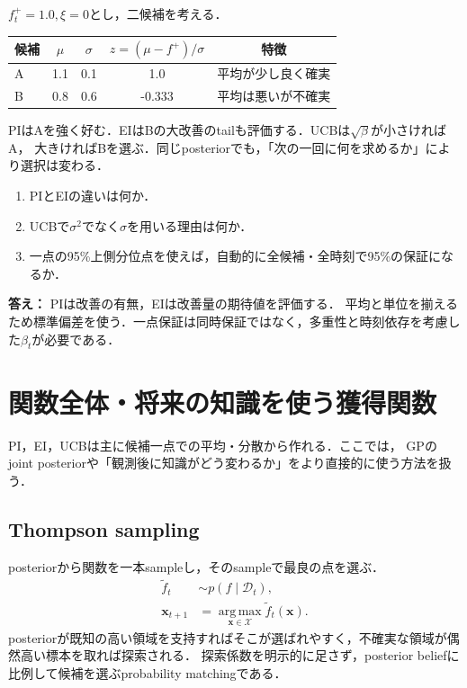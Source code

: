 \documentclass[a4paper,11pt]{ltjsarticle}
\newcommand{\D}{\mathcal D}
\newcommand{\argmax}{\operatorname*{arg\,max}}
\begin{document}
\(f_t^+=1.0,\xi=0\)とし，二候補を考える．
\begin{center}
\begin{tabular}{lcccc}
\toprule
候補&\(\mu\)&\(\sigma\)&\(z=(\mu-f^+)/\sigma\)&特徴\\
\midrule
A&1.1&0.1&1.0&平均が少し良く確実\\
B&0.8&0.6&-0.333&平均は悪いが不確実\\
\bottomrule
\end{tabular}
\end{center}
PIはAを強く好む．EIはBの大改善のtailも評価する．UCBは\(\sqrt\beta\)が小さければA，
大きければBを選ぶ．同じposteriorでも，「次の一回に何を求めるか」により選択は変わる．

\begin{checkpointbox}
\begin{enumerate}
  \item PIとEIの違いは何か．
  \item UCBで\(\sigma^2\)でなく\(\sigma\)を用いる理由は何か．
  \item 一点の95\%上側分位点を使えば，自動的に全候補・全時刻で95\%の保証になるか．
\end{enumerate}
\textbf{答え：} PIは改善の有無，EIは改善量の期待値を評価する．
平均と単位を揃えるため標準偏差を使う．一点保証は同時保証ではなく，多重性と時刻依存を考慮した\(\beta_t\)が必要である．
\end{checkpointbox}

\section{関数全体・将来の知識を使う獲得関数}
\label{sec:global-acquisitions}

PI，EI，UCBは主に候補一点での平均・分散から作れる．ここでは，
GPのjoint posteriorや「観測後に知識がどう変わるか」をより直接的に使う方法を扱う．

\subsection{Thompson sampling}
\label{sec:thompson}

posteriorから関数を一本sampleし，そのsampleで最良の点を選ぶ\citep{thompson1933}．
\begin{align}
  \widetilde f_t&\sim p(f\mid\D_t),\\
  \bm x_{t+1}&=\argmax_{\bm x\in\mathcal X}\widetilde f_t(\bm x).
  \label{eq:thompson-sampling}
\end{align}
posteriorが既知の高い領域を支持すればそこが選ばれやすく，不確実な領域が偶然高い標本を取れば探索される．
探索係数を明示的に足さず，posterior beliefに比例して候補を選ぶprobability matchingである．
\end{document}
